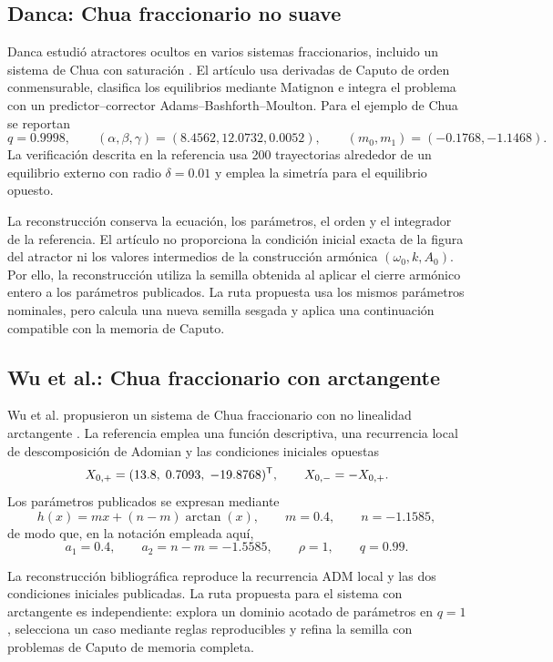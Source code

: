 \subsection{Danca: Chua fraccionario no suave}

Danca estudió atractores ocultos en varios sistemas fraccionarios, incluido un
sistema de Chua con saturación \cite{Danca2017}. El artículo usa derivadas
de Caputo de orden conmensurable, clasifica los equilibrios mediante Matignon e integra
el problema con un predictor--corrector Adams--Bashforth--Moulton. Para el
ejemplo de Chua se reportan
\[
q=0.9998,\qquad
(\alpha,\beta,\gamma)=(8.4562,12.0732,0.0052),\qquad
(m_0,m_1)=(-0.1768,-1.1468).
\]
La verificación descrita en la referencia usa 200 trayectorias alrededor de un
equilibrio externo con radio \(\delta=0.01\) y emplea la simetría para el
equilibrio opuesto.

La reconstrucción conserva la ecuación, los
parámetros, el orden y el integrador de la referencia. El artículo no
proporciona la condición inicial exacta de la figura del atractor ni los
valores intermedios de la construcción armónica
\((\omega_0,k,A_0)\). Por ello, la reconstrucción utiliza la semilla obtenida
al aplicar el cierre armónico entero a los parámetros publicados.
La ruta propuesta usa los mismos parámetros
nominales, pero calcula una nueva semilla sesgada y aplica una continuación
compatible con la memoria de Caputo.

\subsection{Wu et al.: Chua fraccionario con arctangente}

Wu et al. propusieron un sistema de Chua fraccionario con no linealidad
arctangente \cite{Wu2023ArctanChua}. La referencia emplea una función
descriptiva, una recurrencia local de descomposición de Adomian y las
condiciones iniciales opuestas
\[
X_{0,+}=(13.8,\;0.7093,\;-19.8768)^{\mathsf T},
\qquad X_{0,-}=-X_{0,+}.
\]
Los parámetros publicados se expresan mediante
\[
h(x)=mx+(n-m)\arctan(x),\qquad
m=0.4,\qquad n=-1.1585,
\]
de modo que, en la notación empleada aquí,
\[
a_1=0.4,\qquad a_2=n-m=-1.5585,\qquad \rho=1,\qquad q=0.99.
\]

La reconstrucción bibliográfica reproduce la recurrencia ADM local y las dos
condiciones iniciales publicadas. La ruta propuesta para el sistema con
arctangente es independiente: explora un dominio acotado de parámetros en
\(q=1\), selecciona un caso mediante reglas reproducibles y refina la semilla
con problemas de Caputo de memoria completa.

